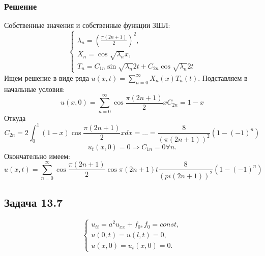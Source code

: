 \documentclass[11pt]{article}
\begin{document}
\subsubsection{Решение}
\label{sec:orgd7d52bc}
Собственные значения и собственные функции ЗШЛ:
\begin{equation}
\begin{cases}
\lambda_n = \left(\frac{\pi(2n + 1)}2\right)^2, \\
X_n = \cos\sqrt{\lambda_n}x, \\
T_n = C_{1n}\sin\sqrt{\lambda_n}2t + C_{2n}\cos\sqrt{\lambda_n}2t
\end{cases}
\end{equation}
Ищем решение в виде ряда $u(x, t) = \sum_{n = 0}^{\infty}X_n(x)T_n(t)$. Подставляем в начальные
условия:
\begin{equation}
u(x, 0) = \sum_{n = 0}^{\infty}\cos\frac{\pi (2n + 1)}2xC_{2n} = 1 - x
\end{equation}
Откуда
\begin{equation}
C_{2n} = 2\int_0^1(1 - x)\cos\frac{\pi (2n + 1)}2xdx = \ldots = \frac8{(\pi(2n + 1))^2}(1 - (-1)^n)
\end{equation}
\begin{equation}
u_t(x, 0) = 0 \Rightarrow C_{1n} = 0 \forall n.
\end{equation}
Окончательно имеем:
\begin{equation}
u(x, t) = \sum_{n = 0}^{\infty}\cos\frac{\pi(2n + 1)}2\cos\pi(2n + 1)t\frac8{(pi(2n + 1))^2}(1 - (-1)^n)
\end{equation}
\subsection{Задача 13.7}
\label{sec:orgc5664bf}
\begin{equation}
\begin{cases}
u_{tt} = a^2u_{xx} + f_0, f_0 = const, \\
u(0, t) = u(l, t) = 0, \\
u(x, 0) = u_t(x, 0) = 0.
\end{cases}
\end{equation}
\end{document}
